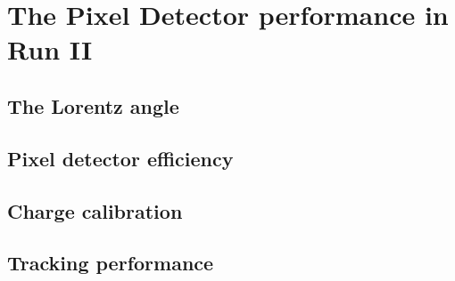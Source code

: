 \section{The Pixel Detector performance in Run II}\label{sec:Pix_performance}
\subsection{The Lorentz angle}
\subsection{Pixel detector efficiency}
\subsection{Charge calibration}
\subsection{Tracking performance}

\pagebreak